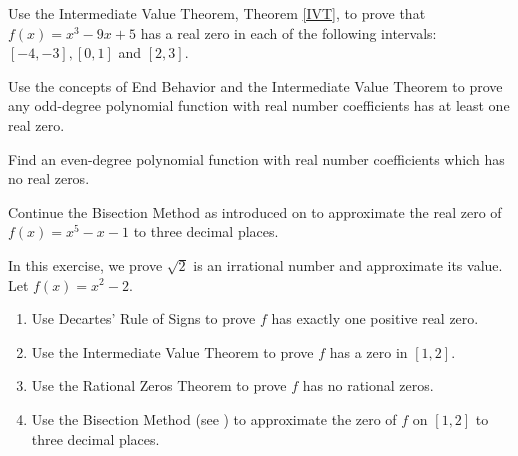 \documentclass{ximera}
\begin{document}
\begin{problem}
Use the Intermediate Value Theorem, Theorem \ref{IVT}, to prove that $f(x) = x^{3} - 9x + 5$ has a real zero in each of the following intervals: $[-4, -3], [0, 1]$ and $[2, 3]$.  
\end{problem}

\begin{problem}
Use the concepts of End Behavior and the Intermediate Value Theorem to prove any odd-degree polynomial function with real number coefficients has at least one real zero.
\end{problem}

\begin{problem}
Find an even-degree polynomial function with real number coefficients which has no real zeros.
\end{problem}

\begin{problem}\label{bisectionexercise} 
Continue  the Bisection Method as introduced on  \pageref{bisectionmethod} to approximate the real zero of $f(x) = x^5-x-1$ to three decimal places.
\end{problem}

\begin{problem}\label{sqrt2isirrationalexercise} 
In this exercise, we prove $\sqrt{2}$ is an irrational number and approximate its value.  Let $f(x) = x^2-2$.

\begin{enumerate} 

\item Use Decartes' Rule of Signs to prove $f$ has exactly one positive real zero.

\item Use the Intermediate Value Theorem to prove $f$ has a zero in $[1,2]$.

\item\label{sqrt2isirrationalexercise}  
Use the Rational Zeros Theorem to prove $f$ has no rational zeros.

\item  Use the Bisection Method (see  \pageref{bisectionmethod}) to approximate the zero of $f$ on $[1,2]$ to three decimal places.
\end{enumerate}
\end{problem}
\end{document}
